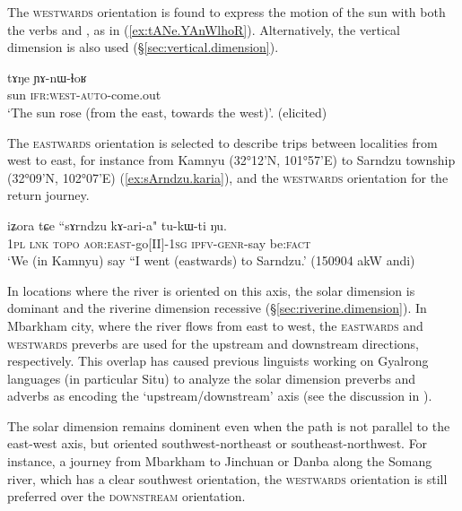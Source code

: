 The \textsc{westwards} orientation is found to express the motion of the sun with both the verbs  and , as in (\ref{ex:tANe.YAnWlhoR}). Alternatively, the vertical dimension is also used (§\ref{sec:vertical.dimension}).

\begin{exe}
\ex \label{ex:tANe.YAnWlhoR}
\gll tɤŋe ɲɤ-nɯ-ɬoʁ \\
sun \textsc{ifr}:\textsc{west}-\textsc{auto}-come.out \\
\glt `The sun rose (from the east, towards the west)'. (elicited)
\end{exe}

The \textsc{eastwards} orientation is selected to describe trips between localities from west to east, for instance from Kamnyu (32°12'N, 101°57'E) to Sarndzu township (32°09'N, 102°07'E) (\ref{ex:sArndzu.karia}), and the \textsc{westwards} orientation for the return journey.

\begin{exe}
\ex \label{ex:sArndzu.karia}
\gll  iʑora tɕe ``sɤrndzu kɤ-ari-a" tu-kɯ-ti ŋu. \\
\textsc{1pl} \textsc{lnk}  \textsc{topo} \textsc{aor}:\textsc{east}-go[II]-\textsc{1sg} \textsc{ipfv}-\textsc{genr}-say be:\textsc{fact} \\
\glt `We (in Kamnyu) say ``I went (eastwards) to Sarndzu.' (150904 akW andi) 
\end{exe}

In locations where the river is oriented on this axis, the solar dimension is dominant and the riverine dimension recessive (§\ref{sec:riverine.dimension}). In Mbarkham city, where the river flows from east to west, the \textsc{eastwards} and \textsc{westwards} preverbs are used for the upstream and downstream directions, respectively. This overlap has caused previous linguists working on Gyalrong languages (in particular Situ) to analyze the solar dimension preverbs and adverbs as encoding the `upstream/downstream' axis (see the discussion in \citealt{lin02dimension}).

The solar dimension remains dominent even when the path is not parallel to the east-west axis, but oriented southwest-northeast or southeast-northwest. For instance, a journey from Mbarkham to Jinchuan or Danba along the Somang river, which has a clear southwest orientation, the \textsc{westwards} orientation is still preferred over the \textsc{downstream} orientation.

